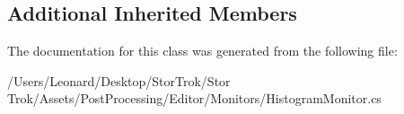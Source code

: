 \subsection*{Additional Inherited Members}


The documentation for this class was generated from the following file\+:\begin{DoxyCompactItemize}
\item 
/\+Users/\+Leonard/\+Desktop/\+Stor\+Trok/\+Stor Trok/\+Assets/\+Post\+Processing/\+Editor/\+Monitors/Histogram\+Monitor.\+cs\end{DoxyCompactItemize}
